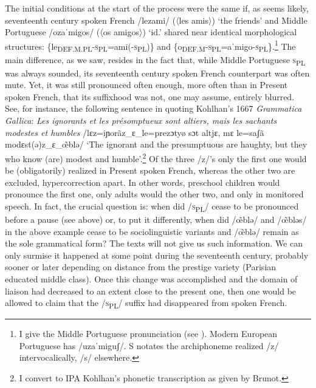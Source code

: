 \documentclass[output=paper]{langscibook}
\begin{document}
The initial conditions at the start of the process were the same if, as seems likely, seventeenth century spoken French /lezami/ (〈les amis〉) ‘the friends’ and Middle Portuguese /ozaˈmigos/ (〈os amigos〉)  ‘id.’ shared near identical morphological structures: \{le\textsubscript{DEF.M.PL}{}-\textsc{s}\textsubscript{PL}=ami(-\textsc{s}\textsubscript{PL})\} and \{o\textsubscript{DEF.M}{}-\textsc{s}\textsubscript{PL}=aˈmigo-\textsc{s}\textsubscript{PL}\}.\footnote{I give the Middle Portuguese pronunciation (see \citealt{Teyssier1980}). Modern European Portuguese has /uzaˈmiguʃ/. S notates the archiphoneme realized /z/ intervocalically, /s/ elsewhere.} The main difference, as we saw, resides in the fact that, while Middle Portuguese \textsc{s}\textsubscript{PL} was always sounded, its seventeenth century spoken French counterpart was often mute. Yet, it was still pronounced often enough, more often than in Present spoken French, that its suffixhood was not, one may assume, entirely blurred. See, for instance, the following sentence in \citet[216]{Brunot1939} quoting Kohlhan's 1667 \textit{Grammatica Gallica}: \textit{Les ignorants et les présomptueux sont altiers, mais les sachants modestes et humbles} /lɛz=iɲorãz\_ɛ\_le=prezɔtyø sɔt altjɛ, mɛ le=saʃã modɛst(ə)z\_ɛ\_\~{œ}blə/ ‘The ignorant and the presumptuous are haughty, but they who know (are) modest and humble’.\footnote{I convert to IPA Kohlhan’s phonetic transcription as given by Brunot.} Of the three /z/'s only the first one would be (obligatorily) realized in Present spoken French, whereas the other two are excluded, hypercorrection apart. In other words, preschool children would pronounce the first one, only adults would the other two, and only in monitored speech. In fact, the crucial question is: when did /\textsc{s}\textsubscript{PL}/ cease to be pronounced before a pause (see above) or, to put it differently, when did /\~{œ}blə/ and /\~{œ}bləs/ in the above example cease to be sociolinguistic variants and /\~{œ}blə/ remain as the sole grammatical form? The texts will not give us such information. We can only surmise it happened at some point during the seventeenth century, probably sooner or later depending on distance from the prestige variety (Parisian educated middle class). Once this change was accomplished and the domain of liaison had decreased to an extent close to the present one, then one would be allowed to claim that the /\textsc{s}\textsubscript{PL}/ suffix had disappeared from spoken French.
\end{document}
